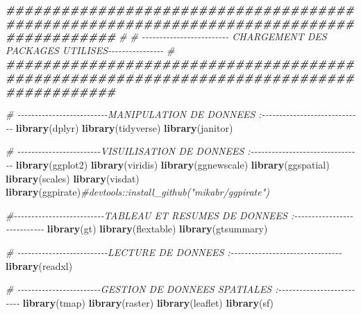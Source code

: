 \documentclass[
]{article}
\newenvironment{Shaded}{\begin{snugshade}}{\end{snugshade}}
\newcommand{\CommentTok}[1]{\textcolor[rgb]{0.56,0.35,0.01}{\textit{#1}}}
\newcommand{\DocumentationTok}[1]{\textcolor[rgb]{0.56,0.35,0.01}{\textbf{\textit{#1}}}}
\newcommand{\FunctionTok}[1]{\textcolor[rgb]{0.13,0.29,0.53}{\textbf{#1}}}
\newcommand{\NormalTok}[1]{#1}
\begin{document}
\begin{Shaded}
\begin{Highlighting}[]
\DocumentationTok{\#\#\#\#\#\#\#\#\#\#\#\#\#\#\#\#\#\#\#\#\#\#\#\#\#\#\#\#\#\#\#\#\#\#\#\#\#\#\#\#\#\#\#\#\#\#\#\#\#\#\#\#\#\#\#\#\#\#\#\#\#\#\#\#\#\#\#\#\#\#\#\#\#\#\#\#\#\#\#\#\#\#\#\#\#\#\#\#}
\CommentTok{\#                                                             }
\CommentTok{\# {-}{-}{-}{-}{-}{-}{-}{-}{-}{-}{-}{-}{-}{-}{-}{-}{-}{-}{-}{-}{-}{-}{-}{-}{-} CHARGEMENT DES PACKAGES UTILISES{-}{-}{-}{-}{-}{-}{-}{-}{-}{-}{-}{-}{-}{-}{-}{-}}
\CommentTok{\#                                                             }
\DocumentationTok{\#\#\#\#\#\#\#\#\#\#\#\#\#\#\#\#\#\#\#\#\#\#\#\#\#\#\#\#\#\#\#\#\#\#\#\#\#\#\#\#\#\#\#\#\#\#\#\#\#\#\#\#\#\#\#\#\#\#\#\#\#\#\#\#\#\#\#\#\#\#\#\#\#\#\#\#\#\#\#\#\#\#\#\#\#\#\#\#}

\CommentTok{\# {-}{-}{-}{-}{-}{-}{-}{-}{-}{-}{-}{-}{-}{-}{-}{-}{-}{-}{-}{-}{-}{-}{-}{-}{-}{-}MANIPULATION DE DONNEES :{-}{-}{-}{-}{-}{-}{-}{-}{-}{-}{-}{-}{-}{-}{-}{-}{-}{-}{-}{-}{-}{-}{-}{-}{-}{-}{-}{-}{-}}
\FunctionTok{library}\NormalTok{(dplyr)}
\FunctionTok{library}\NormalTok{(tidyverse)}
\FunctionTok{library}\NormalTok{(janitor)}

\CommentTok{\# {-}{-}{-}{-}{-}{-}{-}{-}{-}{-}{-}{-}{-}{-}{-}{-}{-}{-}{-}{-}{-}{-}{-}{-}VISUILISATION DE DONNEES :{-}{-}{-}{-}{-}{-}{-}{-}{-}{-}{-}{-}{-}{-}{-}{-}{-}{-}{-}{-}{-}{-}{-}{-}{-}{-}{-}{-}{-}{-}{-}{-}}
\FunctionTok{library}\NormalTok{(ggplot2)}
\FunctionTok{library}\NormalTok{(viridis)}
\FunctionTok{library}\NormalTok{(ggnewscale)}
\FunctionTok{library}\NormalTok{(ggspatial)}
\FunctionTok{library}\NormalTok{(scales)}
\FunctionTok{library}\NormalTok{(visdat)}
\FunctionTok{library}\NormalTok{(ggpirate)}\CommentTok{\#devtools::install\_github("mikabr/ggpirate")}


\CommentTok{\#{-}{-}{-}{-}{-}{-}{-}{-}{-}{-}{-}{-}{-}{-}{-}{-}{-}{-}{-}{-}{-}{-}{-}{-}{-}{-}TABLEAU ET RESUMES DE DONNEES :{-}{-}{-}{-}{-}{-}{-}{-}{-}{-}{-}{-}{-}{-}{-}{-}{-}{-}{-}{-}{-}{-}{-}{-}{-}{-}{-}{-}}
\FunctionTok{library}\NormalTok{(gt)}
\FunctionTok{library}\NormalTok{(flextable)}
\FunctionTok{library}\NormalTok{(gtsummary)}


\CommentTok{\# {-}{-}{-}{-}{-}{-}{-}{-}{-}{-}{-}{-}{-}{-}{-}{-}{-}{-}{-}{-}{-}{-}{-}{-}{-}{-}LECTURE DE DONNEES :{-}{-}{-}{-}{-}{-}{-}{-}{-}{-}{-}{-}{-}{-}{-}{-}{-}{-}{-}{-}{-}{-}{-}{-}{-}{-}{-}{-}{-}{-}{-}{-}}
\FunctionTok{library}\NormalTok{(readxl)}


\CommentTok{\# {-}{-}{-}{-}{-}{-}{-}{-}{-}{-}{-}{-}{-}{-}{-}{-}{-}{-}{-}{-}{-}{-}{-}{-}GESTION DE DONNEES SPATIALES :{-}{-}{-}{-}{-}{-}{-}{-}{-}{-}{-}{-}{-}{-}{-}{-}{-}{-}{-}{-}{-}{-}{-}{-}{-}{-}}
\FunctionTok{library}\NormalTok{(tmap)}
\FunctionTok{library}\NormalTok{(raster)}
\FunctionTok{library}\NormalTok{(leaflet)}
\FunctionTok{library}\NormalTok{(sf)}



\end{Highlighting}
\end{Shaded}
\end{document}
